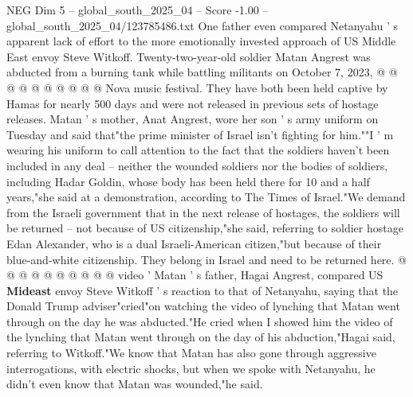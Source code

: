\begin{textsample}{NEG Dim 5 – global\_south\_2025\_04 – Score -1.00 – global\_south\_2025\_04/123785486.txt}
One father even compared Netanyahu ' s apparent lack of effort to the more emotionally invested approach of US Middle East envoy Steve Witkoff.
Twenty-two-year-old soldier Matan Angrest was abducted from a burning tank while battling militants on October 7, 2023, @ @ @ @ @ @ @ @ @ @ Nova music festival.
They have both been held captive by Hamas for nearly 500 days and were not released in previous sets of hostage releases.
Matan ' s mother, Anat Angrest, wore her son ' s army uniform on Tuesday and said that"the prime minister of Israel isn't fighting for him.""I ' m wearing his uniform to call attention to the fact that the soldiers haven't been included in any deal -- neither the wounded soldiers nor the bodies of soldiers, including Hadar Goldin, whose body has been held there for 10 and a half years,"she said at a demonstration, according to The Times of Israel."We demand from the Israeli government that in the next release of hostages, the soldiers will be returned -- not because of US citizenship,"she said, referring to soldier hostage Edan Alexander, who is a dual Israeli-American citizen,"but because of their blue-and-white citizenship.
They belong in Israel and need to be returned here. @ @ @ @ @ @ @ @ @ @ video ' Matan ' s father, Hagai Angrest, compared US \textbf{Mideast} envoy Steve Witkoff ' s reaction to that of Netanyahu, saying that the Donald Trump adviser"cried"on watching the video of lynching that Matan went through on the day he was abducted."He cried when I showed him the video of the lynching that Matan went through on the day of his abduction,"Hagai said, referring to Witkoff."We know that Matan has also gone through aggressive interrogations, with electric shocks, but when we spoke with Netanyahu, he didn't even know that Matan was wounded,"he said.

\end{textsample}
